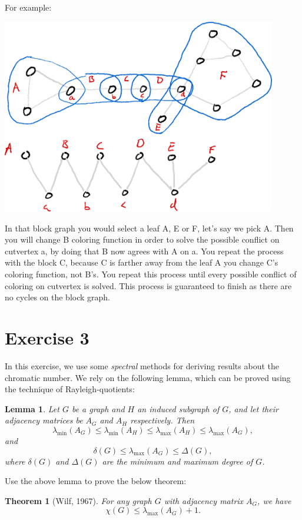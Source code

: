 \documentclass{article}
\newtheorem{lemma}{Lemma}
\newtheorem{theorem}{Theorem}
\begin{document}
For example:

\includegraphics[width=0.9\textwidth]{graph_with_blockgraph.png}

In that block graph you would select a leaf A, E or F, let's say we pick A. Then you will change B coloring function in order to solve the possible conflict on cutvertex a, by doing that B now agrees with A on a. You repeat the process with the block C, because C is farther away from the leaf A you change C's coloring function, not B's. You repeat this process until every possible conflict of coloring on cutvertex is solved. This process is guaranteed to finish as there are no cycles on the block graph. 



\section*{Exercise 3}
 In this exercise, we use some \emph{spectral} methods for deriving results about the chromatic number. We rely on the following lemma, which can be proved using the technique of Rayleigh-quotients:

\begin{lemma}
  Let $G$ be a graph and $H$ an induced subgraph of $G$, and let their adjacency matrices be $A_G$ and $A_H$ respectively. Then
  $$\lambda_{\min}\left(A_G\right) \leq \lambda_{\min}\left(A_H\right) \leq \lambda_{\max}\left(A_H\right) \leq \lambda_{\max}\left(A_G\right),$$
  and
  $$\delta(G) \leq \lambda_{\max}\left(A_G\right) \leq \Delta(G),$$
  where $\delta(G)$ and $\Delta(G)$ are the minimum and maximum degree of $G$.
\end{lemma}

Use the above lemma to prove the below theorem:
\begin{theorem}[Wilf, 1967]
  For any graph $G$ with adjacency matrix $A_G$, we have
  $$\chi(G) \leq \lambda_{\max}\left(A_G\right) + 1.$$
\end{theorem}
\end{document}
